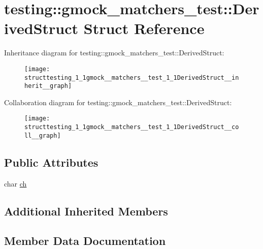 \hypertarget{structtesting_1_1gmock__matchers__test_1_1DerivedStruct}{}\section{testing\+:\+:gmock\+\_\+matchers\+\_\+test\+:\+:Derived\+Struct Struct Reference}
\label{structtesting_1_1gmock__matchers__test_1_1DerivedStruct}


Inheritance diagram for testing\+:\+:gmock\+\_\+matchers\+\_\+test\+:\+:Derived\+Struct\+:
\nopagebreak
\begin{figure}[H]
\begin{center}
\leavevmode
\texttt{[image: structtesting\_1\_1gmock\_\_matchers\_\_test\_1\_1DerivedStruct\_\_inherit\_\_graph]}
\end{center}
\end{figure}


Collaboration diagram for testing\+:\+:gmock\+\_\+matchers\+\_\+test\+:\+:Derived\+Struct\+:
\nopagebreak
\begin{figure}[H]
\begin{center}
\leavevmode
\texttt{[image: structtesting\_1\_1gmock\_\_matchers\_\_test\_1\_1DerivedStruct\_\_coll\_\_graph]}
\end{center}
\end{figure}
\subsection*{Public Attributes}
\begin{DoxyCompactItemize}
\item 
char \hyperlink{structtesting_1_1gmock__matchers__test_1_1DerivedStruct_abd7de960817b2c889f109ae6f2869f4c}{ch}
\end{DoxyCompactItemize}
\subsection*{Additional Inherited Members}


\subsection{Member Data Documentation}

